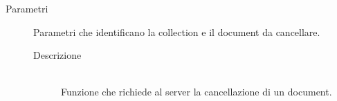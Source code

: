 \begin{description}
\begin{mldescription}
  \begin{description}
  	\item[Parametri]
  		\begin{mldescription}
        Parametri che identificano la collection e il document da cancellare.
  		\end{mldescription}
 	\begin{description} 	
  	\item[Descrizione] \hfill \\
    Funzione che richiede al server la cancellazione di un document.
    \end{description}

  \end{description}
 \end{mldescription}
\end{description}

